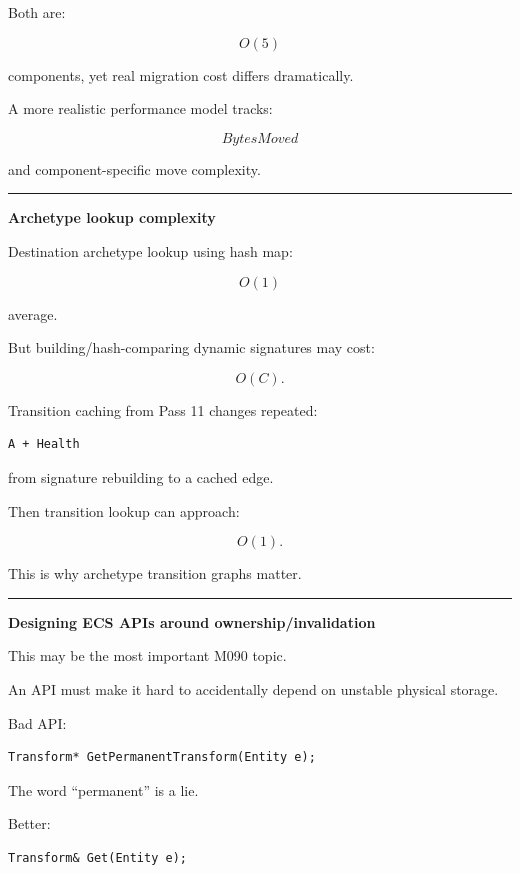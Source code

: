 Both are:

\[
O(5)
\]

components, yet real migration cost differs dramatically.

A more realistic performance model tracks:

\[
BytesMoved
\]

and component-specific move complexity.

\begin{center}\rule{0.5\linewidth}{0.5pt}\end{center}

\textbf{Archetype lookup complexity}

Destination archetype lookup using hash map:

\[
O(1)
\]

average.

But building/hash-comparing dynamic signatures may cost:

\[
O(C).
\]

Transition caching from Pass 11 changes repeated:

\begin{verbatim}
A + Health
\end{verbatim}

from signature rebuilding to a cached edge.

Then transition lookup can approach:

\[
O(1).
\]

This is why archetype transition graphs matter.

\begin{center}\rule{0.5\linewidth}{0.5pt}\end{center}

\textbf{Designing ECS APIs around ownership/invalidation}

This may be the most important M090 topic.

An API must make it hard to accidentally depend on unstable physical storage.

Bad API:

\begin{verbatim}
Transform* GetPermanentTransform(Entity e);
\end{verbatim}

The word ``permanent'' is a lie.

Better:

\begin{verbatim}
Transform& Get(Entity e);
\end{verbatim}

